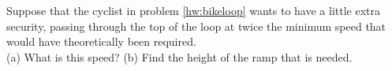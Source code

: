 Suppose that the cyclist in problem \ref{hw:bikeloop} wants to
have a little extra security, passing through the top of the loop
at twice the minimum speed that would have theoretically been required.\\
%
(a) What is this speed?\answercheck\hwendpart
%
(b) Find the height of the ramp that is needed.\answercheck
